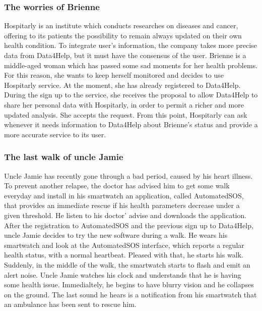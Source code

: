 \documentclass[a4paper]{article}
\begin{document}
    \subsubsection{The worries of Brienne}
    Hospitarly is an institute which conducts researches on diseases and cancer, offering to its patients the possibility to remain always updated on their own health condition. To integrate user's information, the company takes more precise data from Data4Help, but it must have the consensus of the user. \newline
    Brienne is a middle-aged woman which has passed some sad moments for her health problems. For this reason, she wants to keep herself monitored and decides to use Hospitarly service. At the moment, she has already registered to Data4Help. \newline
    During the sign up to the service, she receives the proposal to allow Data4Help to share her personal data with Hospitarly, in order to permit a richer and more updated analysis. She accepts the request. \newline
    From this point, Hospitarly can ask whenever it needs information to Data4Help about Brienne's status and provide a more accurate service to its user.
    
    \subsubsection{The last walk of uncle Jamie}
    Uncle Jamie has recently gone through a bad period, caused by his heart illness. To prevent another relapse, the doctor has advised him to get some walk everyday and install in his smartwatch an application, called AutomatedSOS, that provides an immediate rescue if his health parameters decrease under a given threshold. He listen to his doctor' advise and downloads the application. \newline
    After the registration to AutomatedSOS and the previous sign up to Data4Help, uncle Jamie decides to try the new software during a walk. He wears his smartwatch and look at the AutomatedSOS interface, which reports a regular health status, with a normal heartbeat. Pleased with that, he starts his walk. \newline
    Suddenly, in the middle of the walk, the smartwatch starts to   flash and emit an alert noise. Uncle Jamie watches his clock and understands that he is having some health issue. Immedialtely, he begins to have blurry vision and he collapses on the ground. \newline
    The last sound he hears is a notification from his smartwatch that an ambulance has been sent to rescue him.
    
\end{document}
